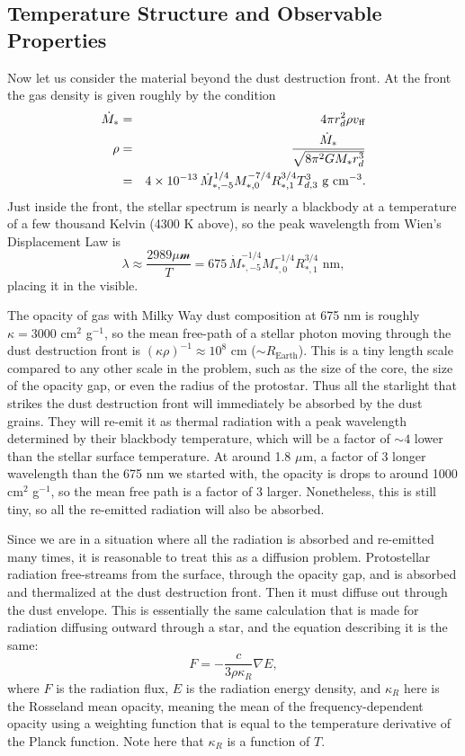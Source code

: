 \subsection{Temperature Structure and Observable Properties}

Now let us consider the material beyond the dust destruction front. At the front the gas density is given roughly by the condition
\begin{eqnarray}
\dot{M}_* & = & 4\pi r_d^2 \rho v_{\rm ff} \\
\rho & = & \frac{\dot{M}_*}{\sqrt{8 \pi^2 G M_* r_d^3}} \\
& = & 4\times 10^{-13} \, \dot{M}_{*,-5}^{1/4} M_{*,0}^{-7/4} R_{*,1}^{3/4} T_{d,3}^3\mbox{ g cm}^{-3}.
\end{eqnarray}
Just inside the front, the stellar spectrum is nearly a blackbody at a temperature of a few thousand Kelvin (4300 K above), so the peak wavelength from Wien's Displacement Law is
\begin{equation}
\lambda \approx \frac{2989 \mu\mathcal{m}}{T} = 675 \, \dot{M}_{*,-5}^{-1/4} M_{*,0}^{-1/4} R_{*,1}^{3/4}\mbox{ nm},
\end{equation}
placing it in the visible.

The opacity of gas with Milky Way dust composition at 675 nm is roughly $\kappa=3000$ cm$^2$ g$^{-1}$, so the mean free-path of a stellar photon moving through the dust destruction front is $(\kappa\rho)^{-1} \approx 10^8$ cm ($\sim R_\mathrm{Earth}$). This is a tiny length scale compared to any other scale in the problem, such as the size of the core, the size of the opacity gap, or even the radius of the protostar. Thus all the starlight that strikes the dust destruction front will immediately be absorbed by the dust grains. They will re-emit it as thermal radiation with a peak wavelength determined by their blackbody temperature, which will be a factor of $\sim 4$ lower than the stellar surface temperature. At around 1.8 $\mu$m, a factor of 3 longer wavelength than the 675 nm we started with, the opacity is drops to around 1000 cm$^2$ g$^{-1}$, so the mean free path is a factor of 3 larger. Nonetheless, this is still tiny, so all the re-emitted radiation will also be absorbed.

Since we are in a situation where all the radiation is absorbed and re-emitted many times, it is reasonable to treat this as a diffusion problem. Protostellar radiation free-streams from the surface, through the opacity gap, and is absorbed and thermalized at the dust destruction front. Then it must diffuse out through the dust envelope. This is essentially the same calculation that is made for radiation diffusing outward through a star, and the equation describing it is the same:
\begin{equation}
F = -\frac{c}{3\rho \kappa_R} \nabla E,
\end{equation}
where $F$ is the radiation flux, $E$ is the radiation energy density, and $\kappa_R$ here is the Rosseland mean opacity, meaning the mean of the frequency-dependent opacity using a weighting function that is equal to the temperature derivative of the Planck function. Note here that $\kappa_R$ is a function of $T$.

